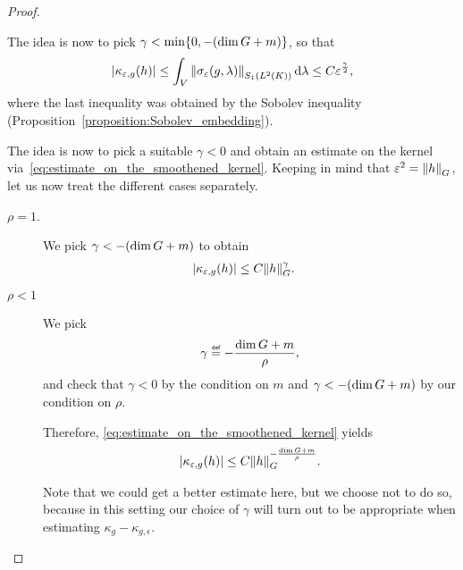 \begin{proof}
\begin{description}
            The idea is now to pick $\gamma < \min \{0, -(\dim \Group + m)\}$, so that
            \begin{align}
                \abs{\kappa_{\epsilon, g}(h)}
                \leq \int_\VectorSpace \norm [\SchattenClasses 1 {\Lebesgue 2 \CompactGroup}] {\sigma_\epsilon(g, \lambda)} \dd \lambda
                \leq C
                \epsilon^{\frac \gamma 2},
                \label{eq:estimate_on_the_smoothened_kernel}
            \end{align}
            where the last inequality was obtained by the Sobolev inequality (Proposition~\ref{proposition:Sobolev_embedding}).

            The idea is now to pick a suitable $\gamma < 0$ and obtain an estimate on the kernel via~\eqref{eq:estimate_on_the_smoothened_kernel}.
            Keeping in mind that $\epsilon^2 = \norm [\Group] h$,
            let us now treat the different cases separately.
            \begin{description}
                \item[$\rho = 1$.] We pick $\gamma < -(\dim \Group + m)$ to obtain
                    \begin{align*}
                        \abs {\kappa_{\epsilon, g}(h)}
                        &\leq C \norm [\Group] h^\gamma.
                    \end{align*}
                \item[$\rho < 1$]
                    We pick
                    \begin{align*}
                        \gamma \defeq -\frac {\dim \Group + m} \rho,
                    \end{align*}
                    and check that $\gamma < 0$ by the condition on $m$ and
                    $\gamma < -(\dim \Group + m)$ by our condition on $\rho$.

                    Therefore, \eqref{eq:estimate_on_the_smoothened_kernel} yields
                    \begin{align*}
                        \abs {\kappa_{\epsilon, g}(h)}
                        \leq C \norm [\Group] h^{-\frac {\dim \Group + m} {\rho}}.
                    \end{align*}

                    Note that we could get a better estimate here,
                    but we choose not to do so,
                    because in this setting our choice of $\gamma$ will turn out to be appropriate when estimating $\kappa_g - \kappa_{g, \epsilon}$.
            \end{description}


\end{description}
\end{proof}
